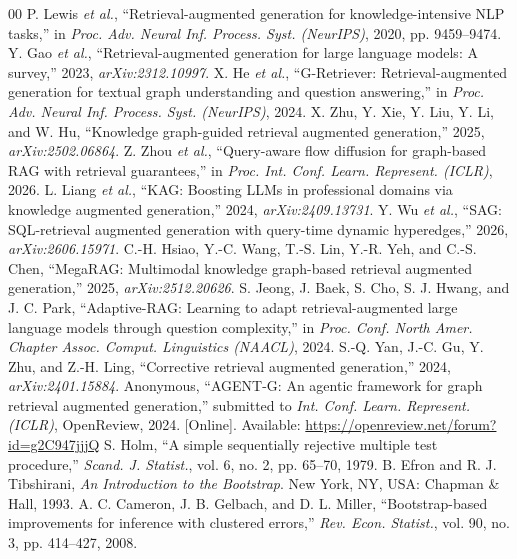 \documentclass[conference]{IEEEtran}
\begin{document}
\begin{thebibliography}{00}
 P. Lewis \emph{et al.}, ``Retrieval-augmented generation for knowledge-intensive NLP tasks,'' in \emph{Proc. Adv. Neural Inf. Process. Syst. (NeurIPS)}, 2020, pp. 9459--9474.
 Y. Gao \emph{et al.}, ``Retrieval-augmented generation for large language models: A survey,'' 2023, \emph{arXiv:2312.10997}.
 X. He \emph{et al.}, ``G-Retriever: Retrieval-augmented generation for textual graph understanding and question answering,'' in \emph{Proc. Adv. Neural Inf. Process. Syst. (NeurIPS)}, 2024.
 X. Zhu, Y. Xie, Y. Liu, Y. Li, and W. Hu, ``Knowledge graph-guided retrieval augmented generation,'' 2025, \emph{arXiv:2502.06864}.
 Z. Zhou \emph{et al.}, ``Query-aware flow diffusion for graph-based RAG with retrieval guarantees,'' in \emph{Proc. Int. Conf. Learn. Represent. (ICLR)}, 2026.
 L. Liang \emph{et al.}, ``KAG: Boosting LLMs in professional domains via knowledge augmented generation,'' 2024, \emph{arXiv:2409.13731}.
 Y. Wu \emph{et al.}, ``SAG: SQL-retrieval augmented generation with query-time dynamic hyperedges,'' 2026, \emph{arXiv:2606.15971}.
 C.-H. Hsiao, Y.-C. Wang, T.-S. Lin, Y.-R. Yeh, and C.-S. Chen, ``MegaRAG: Multimodal knowledge graph-based retrieval augmented generation,'' 2025, \emph{arXiv:2512.20626}.
 S. Jeong, J. Baek, S. Cho, S. J. Hwang, and J. C. Park, ``Adaptive-RAG: Learning to adapt retrieval-augmented large language models through question complexity,'' in \emph{Proc. Conf. North Amer. Chapter Assoc. Comput. Linguistics (NAACL)}, 2024.
 S.-Q. Yan, J.-C. Gu, Y. Zhu, and Z.-H. Ling, ``Corrective retrieval augmented generation,'' 2024, \emph{arXiv:2401.15884}.
 Anonymous, ``AGENT-G: An agentic framework for graph retrieval augmented generation,'' submitted to \emph{Int. Conf. Learn. Represent. (ICLR)}, OpenReview, 2024. [Online]. Available: \url{https://openreview.net/forum?id=g2C947jjjQ}
 S. Holm, ``A simple sequentially rejective multiple test procedure,'' \emph{Scand. J. Statist.}, vol. 6, no. 2, pp. 65--70, 1979.
 B. Efron and R. J. Tibshirani, \emph{An Introduction to the Bootstrap}. New York, NY, USA: Chapman \& Hall, 1993.
 A. C. Cameron, J. B. Gelbach, and D. L. Miller, ``Bootstrap-based improvements for inference with clustered errors,'' \emph{Rev. Econ. Statist.}, vol. 90, no. 3, pp. 414--427, 2008.

\end{thebibliography}
\end{document}
